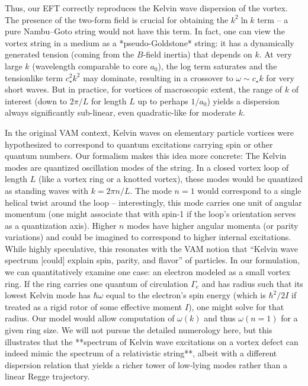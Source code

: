 \documentclass[12pt]{article}
\begin{document}
Thus, our EFT correctly reproduces the Kelvin wave dispersion of the vortex. The presence of the two-form field is crucial for obtaining the $k^2 \ln k$ term – a pure Nambu–Goto string would not have this term. In fact, one can view the vortex string in a medium as a *pseudo-Goldstone* string: it has a dynamically generated tension (coming from the $B$-field inertia) that depends on $k$. At very large $k$ (wavelength comparable to core $a_0$), the log term saturates and the tensionlike term $c_\star^2 k^2$ may dominate, resulting in a crossover to $\omega \sim c_\star k$ for very short waves. But in practice, for vortices of macroscopic extent, the range of $k$ of interest (down to $2\pi/L$ for length $L$ up to perhaps $1/a_0$) yields a dispersion always significantly sub-linear, even quadratic-like for moderate $k$. 

In the original VAM context, Kelvin waves on elementary particle vortices were hypothesized to correspond to quantum excitations carrying spin or other quantum numbers. Our formalism makes this idea more concrete: The Kelvin modes are quantized oscillation modes of the string. In a closed vortex loop of length $L$ (like a vortex ring or a knotted vortex), these modes would be quantized as standing waves with $k = 2\pi n/L$. The mode $n=1$ would correspond to a single helical twist around the loop – interestingly, this mode carries one unit of angular momentum (one might associate that with spin-1 if the loop’s orientation serves as a quantization axis). Higher $n$ modes have higher angular momenta (or parity variations) and could be imagined to correspond to higher internal excitations. While highly speculative, this resonates with the VAM notion that “Kelvin wave spectrum [could] explain spin, parity, and flavor” of particles. In our formulation, we can quantitatively examine one case: an electron modeled as a small vortex ring. If the ring carries one quantum of circulation $\Gamma_e$ and has radius such that its lowest Kelvin mode has $\hbar \omega$ equal to the electron’s spin energy (which is $\hbar^2/2I$ if treated as a rigid rotor of some effective moment $I$), one might solve for that radius. Our model would allow computation of $\omega(k)$ and thus $\omega(n=1)$ for a given ring size. We will not pursue the detailed numerology here, but this illustrates that the **spectrum of Kelvin wave excitations on a vortex defect can indeed mimic the spectrum of a relativistic string**, albeit with a different dispersion relation that yields a richer tower of low-lying modes rather than a linear Regge trajectory. 
\end{document}

